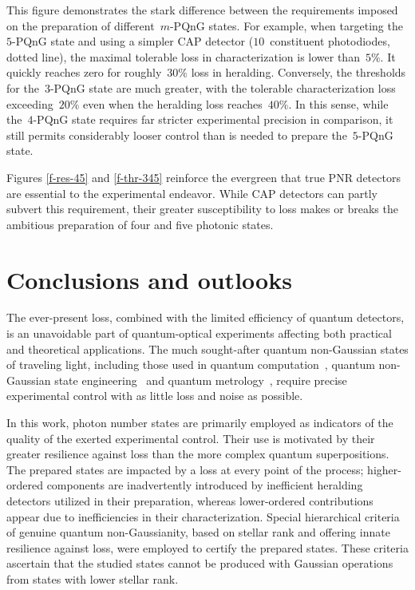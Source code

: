 \documentclass{article}
\begin{document}
This figure demonstrates the stark difference between the requirements imposed on the preparation of different~$m$-PQnG states. For example, when targeting the~$5$-PQnG state and using a simpler CAP detector ($10$~constituent photodiodes, dotted line), the maximal tolerable loss in characterization is lower than~$5\%$. It quickly reaches zero for roughly~$30\%$ loss in heralding. Conversely, the thresholds for the~$3$-PQnG state are much greater, with the tolerable characterization loss exceeding~$20\%$ even when the heralding loss reaches~$40\%$. In this sense, while the~$4$-PQnG state requires far stricter experimental precision in comparison, it still permits considerably looser control than is needed to prepare the~$5$-PQnG state.

Figures \ref{f-res-45} and \ref{f-thr-345} reinforce the evergreen that true PNR detectors are essential to the experimental endeavor. While CAP detectors can partly subvert this requirement, their greater susceptibility to loss makes or breaks the ambitious preparation of four and five photonic states.

%

\FloatBarrier
\section{Conclusions and outlooks}

The ever-present loss, combined with the limited efficiency of quantum detectors, is an unavoidable part of quantum-optical experiments affecting both practical and theoretical applications. The much sought-after quantum non-Gaussian states of traveling light, including those used in quantum computation~\cite{lloyd1999,gottesman2001,menicucci2014,baragiola2019,bourassa2021,madsen2022,aghaeerad2025}, quantum non-Gaussian state engineering~\cite{filip2005,marek2009,marek2011,yukawa2013b,miyata2016,marek2018a,sakaguchi2023} and quantum metrology~\cite{kunitski2019,oh2020}, require precise experimental control with as little loss and noise as possible.

In this work, photon number states are primarily employed as indicators of the quality of the exerted experimental control. Their use is motivated by their greater resilience against loss than the more complex quantum superpositions. The prepared states are impacted by a loss at every point of the process; higher-ordered components are inadvertently introduced by inefficient heralding detectors utilized in their preparation, whereas lower-ordered contributions appear due to inefficiencies in their characterization. Special hierarchical criteria of genuine quantum non-Gaussianity, based on stellar rank and offering innate resilience against loss, were employed to certify the prepared states. These criteria ascertain that the studied states cannot be produced with Gaussian operations from states with lower stellar rank.
\end{document}
